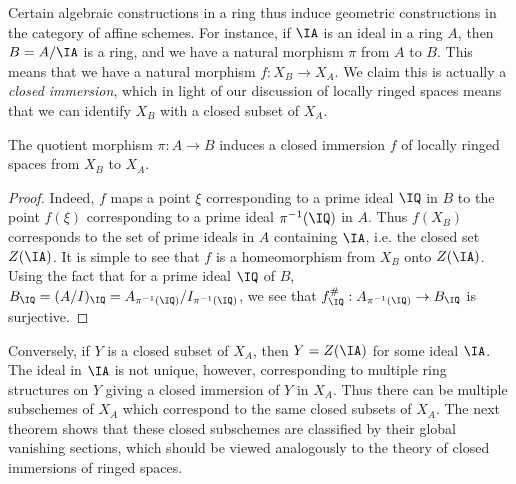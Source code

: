 Certain algebraic constructions in a ring thus induce geometric constructions in the category of affine schemes. For instance, if $\IA$ is an ideal in a ring $A$, then $B = A/\IA$ is a ring, and we have a natural morphism $\pi$ from $A$ to $B$. This means that we have a natural morphism $f: X_B \to X_A$. We claim this is actually a \emph{closed immersion}, which in light of our discussion of locally ringed spaces means that we can identify $X_B$ with a closed subset of $X_A$.

\begin{lemma}
    The quotient morphism $\pi: A \to B$ induces a closed immersion $f$ of locally ringed spaces from $X_B$ to $X_A$.
\end{lemma}
\begin{proof}
    Indeed, $f$ maps a point $\xi$ corresponding to a prime ideal $\IQ$ in $B$ to the point $f(\xi)$ corresponding to a prime ideal $\pi^{-1}(\IQ)$ in $A$. Thus $f(X_B)$ corresponds to the set of prime ideals in $A$ containing $\IA$, i.e. the closed set $Z(\IA)$. It is simple to see that $f$ is a homeomorphism from $X_B$ onto $Z(\IA)$. Using the fact that for a prime ideal $\IQ$ of $B$, $B_{\IQ} = (A/I)_{\IQ} = A_{\pi^{-1}(\IQ)} / I_{\pi^{-1}(\IQ)}$, we see that $f^\#_{\IQ}: A_{\pi^{-1}(\IQ)} \to B_{\IQ}$ is surjective.
\end{proof}

Conversely, if $Y$ is a closed subset of $X_A$, then $Y = Z(\IA)$ for some ideal $\IA$. The ideal in $\IA$ is not unique, however, corresponding to multiple ring structures on $Y$ giving a closed immersion of $Y$ in $X_A$. Thus there can be multiple subschemes of $X_A$ which correspond to the same closed subsets of $X_A$. The next theorem shows that these closed subschemes are classified by their global vanishing sections, which should be viewed analogously to the theory of closed immersions of ringed spaces.

